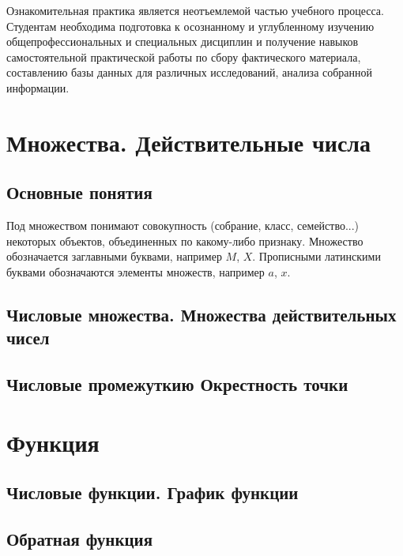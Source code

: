 \documentclass[14pt]{extreport}
\begin{document}



\tableofcontents

\intro

Ознакомительная практика является неотъемлемой частью учебного процесса. Студентам необходима подготовка к осознанному и углубленному изучению общепрофессиональных и специальных дисциплин и получение навыков самостоятельной практической работы по сбору фактического материала, составлению базы данных для различных исследований, анализа собранной информации.

\chapter{Множества. Действительные числа}

\section{Основные понятия}

Под множеством понимают совокупность (собрание, класс, семейство...) некоторых объектов, объединенных по какому-либо признаку.
Множество обозначается заглавными буквами, например $M$, $X$. Прописными латинскими буквами обозначаются элементы множеств, например $a$, $x$.

\section{Числовые множества. Множества действительных чисел}

\section{Числовые промежуткию Окрестность точки}



\chapter{Функция}

\section{Числовые функции. График функции}

\section{Обратная функция}
\end{document}
